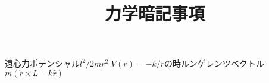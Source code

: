 \documentclass[a4j]{jarticle}
\title{力学暗記事項}
\begin{document}
遠心力ポテンシャル$l^2/2mr^2$
$V(r)=-k/r$の時ルンゲレンツベクトル$m(\dot{r}\times L-k\hat{r})$
\end{document}
